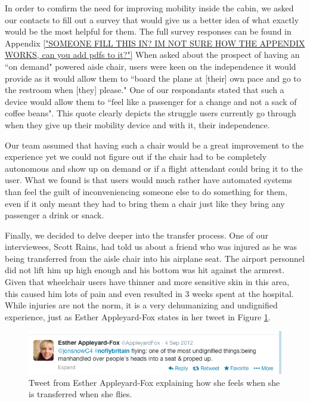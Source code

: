 In order to comfirm the need for improving mobility inside the cabin, we asked our contacts to fill out a survey that would give us a better idea of what exactly would be the most helpful for them. The full survey responses can be found in Appendix \ref{"SOMEONE FILL THIS IN? IM NOT SURE HOW THE APPENDIX WORKS, can you add pdfs to it?"} 
When asked about the prospect of having an ``on demand"  powered aisle chair, users were keen on the independence it would provide as it would allow them to ``board the plane at [their] own pace and go to the restroom when [they] please." One of our respondants stated that such a device would allow them to ``feel like a passenger for a change and not a sack of coffee beans". This quote clearly depicts the struggle users currently go through when they give up their mobility device and with it, their independence.

Our team assumed that having such a chair would be a great improvement to the experience yet we could not figure out if the chair had to be completely autonomous and show up on demand or if a flight attendant could bring it to the user. What we found is that users would much rather have automated systems than feel the guilt of inconveniencing someone else to do something for them, even if it only meant they had to bring them a chair just like they bring any passenger a drink or snack. 

Finally, we decided to delve deeper into the transfer process. One of our interviewees, Scott Rains, had told us about a friend who was injured as he was being transferred from the aisle chair into his airplane seat. The airport personnel did not lift him up high enough and his bottom was hit against the armrest. Given that wheelchair users have thinner and more sensitive skin in this area, this caused him lots of pain and even resulted in 3 weeks spent at the hospital. While injuries are not the norm, it is a very dehumanizing and undignified experience, just as Esther Appleyard-Fox states in her tweet in Figure \ref{fig:MobilityTweet.png}. 


\begin{figure}[h]
  \centering
     \includegraphics[width=12cm]{images/MobilityTweet.png}
   \caption{Tweet from Esther Appleyard-Fox explaining how she feels when she is transferred when she flies. }
  \label{fig:MobilityTweet.png}
\end{figure}


